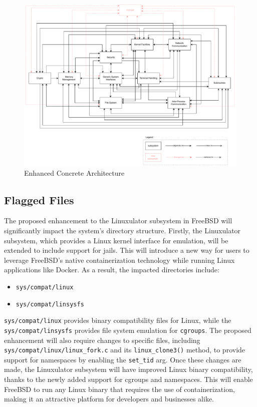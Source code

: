 \documentclass[12pt, dvipsnames, a4paper]{article}
\newcommand{\code}[1]{\texttt{#1}}
\begin{document}
\begin{figure}[!htb]
	\center
	\includegraphics[width = 450pt]{assets/architecture_diagrams/enhanced-concrete-architecture.pdf}
	\caption{Enhanced Concrete Architecture}
\end{figure}

\subsection{Flagged Files}

The proposed enhancement to the Linuxulator subsystem in FreeBSD will significantly impact the system's directory structure. Firstly, the Linuxulator subsystem, which provides a Linux kernel interface for emulation, will be extended to include support for jails. This will introduce a new way for users to leverage FreeBSD's native containerization technology while running Linux applications like Docker.
As a result, the impacted directories include:
\begin{itemize}
	\item \code{sys/compat/linux}
	\item \code{sys/compat/linsysfs}
\end{itemize}

\code{sys/compat/linux} provides binary compatibility files for Linux, while the \code{sys/compat/linsysfs} provides file system emulation for \code{cgroups}. The proposed enhancement will also require changes to specific files, including \code{sys/compat/linux/linux\_fork.c} and its \code{linux\_clone3()} method, to provide support for namespaces by enabling the \code{set\_tid} arg.
Once these changes are made, the Linuxulator subsystem will have improved Linux binary compatibility, thanks to the newly added support for cgroups and namespaces. This will enable FreeBSD to run any Linux binary that requires the use of containerization, making it an attractive platform for developers and businesses alike.
\end{document}
